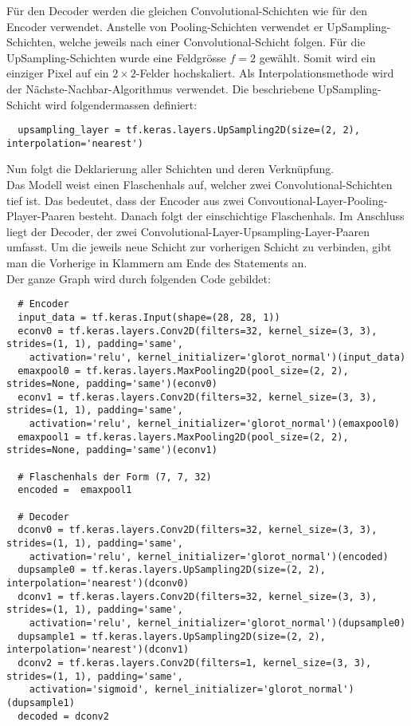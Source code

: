 Für den Decoder werden die gleichen Convolutional-Schichten wie für den Encoder
verwendet. Anstelle von Pooling-Schichten verwendet er UpSampling-Schichten,
welche jeweils nach einer Convolutional-Schicht folgen.
Für die UpSampling-Schichten wurde eine Feldgrösse $f = 2$ gewählt. Somit wird
ein einziger Pixel auf ein $2 \times 2$-Felder hochskaliert.
Als Interpolationsmethode wird der Nächste-Nachbar-Algorithmus verwendet.
Die beschriebene UpSampling-Schicht wird folgendermassen definiert:
\begin{verbatim}
  upsampling_layer = tf.keras.layers.UpSampling2D(size=(2, 2), interpolation='nearest')
\end{verbatim}
Nun folgt die Deklarierung aller Schichten und deren Verknüpfung. \\
Das Modell weist einen Flaschenhals auf, welcher zwei Convolutional-Schichten
tief ist. Das bedeutet, dass der Encoder aus zwei
Convoutional-Layer-Pooling-Player-Paaren besteht. Danach folgt der einschichtige
Flaschenhals. Im Anschluss liegt der Decoder, der zwei
Convolutional-Layer-Upsampling-Layer-Paaren umfasst.
Um die jeweils neue Schicht zur vorherigen Schicht zu verbinden, gibt man die
Vorherige in Klammern am Ende des Statements an. \\
Der ganze Graph wird durch folgenden Code gebildet:
\begin{verbatim}
  # Encoder
  input_data = tf.keras.Input(shape=(28, 28, 1))
  econv0 = tf.keras.layers.Conv2D(filters=32, kernel_size=(3, 3), strides=(1, 1), padding='same',
    activation='relu', kernel_initializer='glorot_normal')(input_data)
  emaxpool0 = tf.keras.layers.MaxPooling2D(pool_size=(2, 2), strides=None, padding='same')(econv0)
  econv1 = tf.keras.layers.Conv2D(filters=32, kernel_size=(3, 3), strides=(1, 1), padding='same',
    activation='relu', kernel_initializer='glorot_normal')(emaxpool0)
  emaxpool1 = tf.keras.layers.MaxPooling2D(pool_size=(2, 2), strides=None, padding='same')(econv1)

  # Flaschenhals der Form (7, 7, 32)
  encoded =  emaxpool1

  # Decoder
  dconv0 = tf.keras.layers.Conv2D(filters=32, kernel_size=(3, 3), strides=(1, 1), padding='same',
    activation='relu', kernel_initializer='glorot_normal')(encoded)
  dupsample0 = tf.keras.layers.UpSampling2D(size=(2, 2), interpolation='nearest')(dconv0)
  dconv1 = tf.keras.layers.Conv2D(filters=32, kernel_size=(3, 3), strides=(1, 1), padding='same',
    activation='relu', kernel_initializer='glorot_normal')(dupsample0)
  dupsample1 = tf.keras.layers.UpSampling2D(size=(2, 2), interpolation='nearest')(dconv1)
  dconv2 = tf.keras.layers.Conv2D(filters=1, kernel_size=(3, 3), strides=(1, 1), padding='same',
    activation='sigmoid', kernel_initializer='glorot_normal')(dupsample1)
  decoded = dconv2
\end{verbatim}

